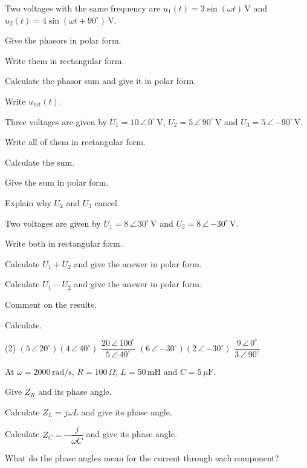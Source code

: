 Two voltages with the same frequency are $u_1(t) = 3\sin(\omega t)\,\text{V}$ and
$u_2(t) = 4\sin(\omega t + 90^{\circ})\,\text{V}$.
\begin{parts}
  \item Give the phasors in polar form.
  \item Write them in rectangular form.
  \item Calculate the phasor sum and give it in polar form.
  \item Write $u_{\text{tot}}(t)$.
\end{parts}

Three voltages are given by $U_1 = 10\,\angle\,0^{\circ}\,\text{V}$,
$U_2 = 5\,\angle\,90^{\circ}\,\text{V}$ and $U_3 = 5\,\angle\,{-90^{\circ}}\,\text{V}$.
\begin{parts}
  \item Write all of them in rectangular form.
  \item Calculate the sum.
  \item Give the sum in polar form.
  \item Explain why $U_2$ and $U_3$ cancel.
\end{parts}

Two voltages are given by $U_1 = 8\,\angle\,30^{\circ}\,\text{V}$ and
$U_2 = 8\,\angle\,{-30^{\circ}}\,\text{V}$.
\begin{parts}
  \item Write both in rectangular form.
  \item Calculate $U_1 + U_2$ and give the answer in polar form.
  \item Calculate $U_1 - U_2$ and give the answer in polar form.
  \item Comment on the results.
\end{parts}

Calculate.
\begin{delar}(2)
  \task $(5\,\angle\,20^{\circ})(4\,\angle\,40^{\circ})$
  \task $\dfrac{20\,\angle\,100^{\circ}}{5\,\angle\,40^{\circ}}$
  \task $(6\,\angle\,{-30^{\circ}})(2\,\angle\,{-30^{\circ}})$
  \task $\dfrac{9\,\angle\,0^{\circ}}{3\,\angle\,90^{\circ}}$
\end{delar}

At $\omega = 2000\,\text{rad/s}$, $R = 100\,\Omega$, $L = 50\,\text{mH}$ and
$C = 5\,\mu\text{F}$.
\begin{parts}
  \item Give $Z_R$ and its phase angle.
  \item Calculate $Z_L = j\omega L$ and give its phase angle.
  \item Calculate $Z_C = -\dfrac{j}{\omega C}$ and give its phase angle.
  \item What do the phase angles mean for the current through each component?
\end{parts}

